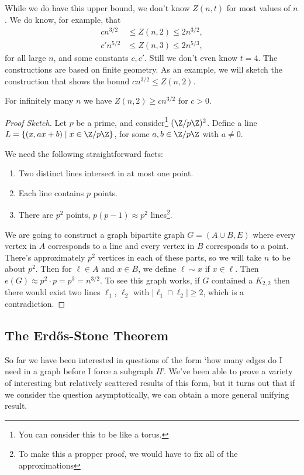 \documentclass[a4paper]{scrartcl}
\begin{document}
While we do have this upper bound, we don't know $Z(n, t)$ for most values of $n$. We do know, for example, that
\begin{align*}
    cn^{3/2} &\leq Z(n, 2) \leq 2 n^{3/2}, \\
    c'n^{5/2} &\leq Z(n, 3) \leq 2 n^{5/3},
 \end{align*}
 for all large $n$, and some constants $c, c'$. Still we don't even know $t = 4$. The constructions are based on finite geometry. As an example, we will sketch the construction that shows the bound $cn^{3/2} \leq Z(n, 2)$.

\begin{theorem}
	For infinitely many $n$ we have $Z(n, 2) \geq cn^{3/2}$ for $c > 0$.
\end{theorem}
\begin{proof}[Proof Sketch]
	Let $p$ be a prime, and consider\footnote{You can consider this to be like a torus.} $(\Z/p\Z)^2$. Define a line $L = \{(x, ax + b) \mid x \in \Z/p\Z\}$, for some $a, b \in \Z/p\Z$ with $a \neq 0$.

	We need the following straightforward facts:
	\begin{enumerate}
		\item Two distinct lines intersect in at most one point.
		\item Each line contains $p$ points.
		\item There are $p^2$ points, $p(p - 1) \approx p^2$ lines\footnote{To make this a propper proof, we would have to fix all of the approximations}.
	\end{enumerate}

	We are going to construct a graph bipartite graph $G = (A \cup B, E)$ where every vertex in $A$ corresponds to a line and every vertex in $B$ corresponds to a point. There's approximately $p^2$ vertices in each of these parts, so we will take $n$ to be about $p^2$. Then for $\ell \in A$ and $x \in B$, we define $\ell \sim x$ if $x \in \ell$. Then $e(G) \approx p^2 \cdot p = p^3 = n^{3/2}$.
	To see this graph works, if $G$ contained a $K_{2,2}$ then there would exist two lines $\ell_1$, $\ell_2$ with $|\ell_1 \cap \ell_2| \geq 2$, which is a contradiction. 
\end{proof}

\subsection{The Erdős-Stone Theorem}

So far we have been interested in questions of the form `how many edges do I need in a graph before I force a subgraph $H$'. 
We've been able to prove a variety of interesting but relatively scattered results of this form, but it turns out that if we consider the question asymptotically, we can obtain a more general unifying result.
\end{document}
